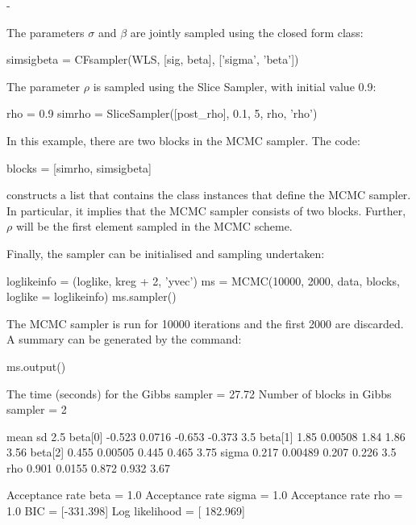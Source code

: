 -\documentclass[article]{jss}
\begin{document}
The parameters $\sigma$ and $\beta$ are jointly sampled using the
closed form class:
\begin{Code}
simsigbeta = CFsampler(WLS, [sig, beta], ['sigma', 'beta'])
\end{Code}

The parameter $\rho$ is sampled using the Slice Sampler, with initial value 0.9:
\begin{Code}
rho = 0.9
simrho = SliceSampler([post_rho], 0.1, 5, rho, 'rho')
\end{Code}

In this example, there are two blocks in the MCMC sampler. The code:
\begin{Code}
blocks = [simrho, simsigbeta]
\end{Code}
constructs a  list that contains the
class instances that define the MCMC sampler. In particular, it
implies that the MCMC sampler consists of two blocks. Further,
$\rho$ will be the first element sampled in the MCMC scheme.


Finally, the sampler can be initialised and sampling undertaken:

\begin{Code}
loglikeinfo = (loglike, kreg + 2, 'yvec')
ms = MCMC(10000, 2000, data, blocks, loglike = loglikeinfo)
ms.sampler()
\end{Code}


The MCMC sampler is run for 10000
iterations and the first 2000 are discarded. A summary can be generated by the  command:

\begin{CodeChunk}
\begin{CodeInput}
ms.output()
\end{CodeInput}
\begin{CodeOutput}
The time (seconds) for the Gibbs sampler =  27.72
Number of blocks in Gibbs sampler =  2

                mean        sd       2.5%
   beta[0]    -0.523    0.0716     -0.653    -0.373        3.5
   beta[1]      1.85   0.00508       1.84      1.86       3.56
   beta[2]     0.455   0.00505      0.445     0.465       3.75
     sigma     0.217   0.00489      0.207     0.226        3.5
       rho     0.901    0.0155      0.872     0.932       3.67

Acceptance rate  beta  =  1.0
Acceptance rate  sigma  =  1.0
Acceptance rate  rho  =  1.0
BIC =  [-331.398]
Log likelihood =  [ 182.969]

\end{CodeOutput}
\end{CodeChunk}
\end{document}
